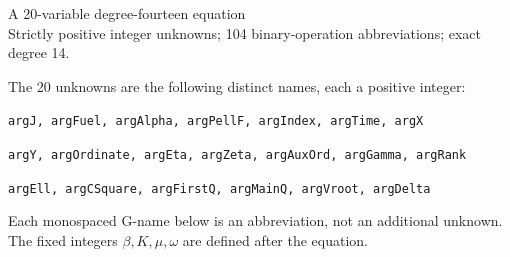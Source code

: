 \documentclass[10pt]{article}
\begin{document}
\begin{center}{\Large A 20-variable degree-fourteen equation}\\
Strictly positive integer unknowns; 104 binary-operation abbreviations; exact degree 14.
\end{center}
The 20 unknowns are the following distinct names, each a positive integer:
\par\small
\noindent\texttt{argJ, argFuel, argAlpha, argPellF, argIndex, argTime, argX}\par
\noindent\texttt{argY, argOrdinate, argEta, argZeta, argAuxOrd, argGamma, argRank}\par
\noindent\texttt{argEll, argCSquare, argFirstQ, argMainQ, argVroot, argDelta}\par
\normalsize
Each monospaced G-name below is an abbreviation, not an additional unknown.
The fixed integers $\beta,K,\mu,\omega$ are defined after the equation.
\end{document}
